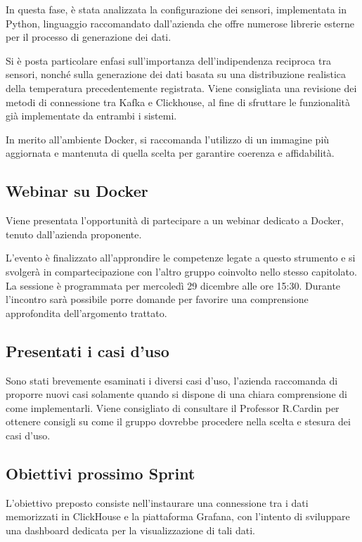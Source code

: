 \documentclass{article}
\begin{document}
In questa fase, è stata analizzata la configurazione dei sensori, implementata in Python, linguaggio raccomandato dall'azienda che offre numerose librerie esterne per il processo di generazione dei dati. 

Si è posta particolare enfasi sull'importanza dell'indipendenza reciproca tra sensori, nonché sulla generazione dei dati basata su una distribuzione realistica della temperatura precedentemente registrata.
Viene consigliata una revisione dei metodi di connessione tra Kafka e Clickhouse, al fine di sfruttare le funzionalità già implementate da entrambi i sistemi.

In merito all'ambiente Docker, si raccomanda l'utilizzo di un immagine più aggiornata e mantenuta di quella scelta per garantire coerenza e affidabilità.

\subsection{Webinar su Docker}
Viene presentata l'opportunità di partecipare a un webinar dedicato a Docker, tenuto dall'azienda proponente.

L'evento è finalizzato all'approndire le competenze legate a questo strumento e si svolgerà in compartecipazione con l'altro gruppo coinvolto nello stesso capitolato. La sessione è programmata per mercoledì 29 dicembre alle ore 15:30. Durante l'incontro sarà possibile porre domande per favorire una comprensione approfondita dell'argomento trattato.

\subsection{Presentati i casi d'uso}
Sono stati brevemente esaminati i diversi casi d'uso, l'azienda raccomanda di proporre nuovi casi solamente quando si dispone di una chiara comprensione di come implementarli.
Viene consigliato di consultare il Professor R.Cardin per ottenere consigli su come il gruppo dovrebbe procedere nella scelta e stesura dei casi d'uso.

\subsection{Obiettivi prossimo Sprint}
L'obiettivo preposto consiste nell'instaurare una connessione tra i dati memorizzati in ClickHouse e la piattaforma Grafana, con l'intento di sviluppare una dashboard dedicata per la visualizzazione di tali dati.
\end{document}
